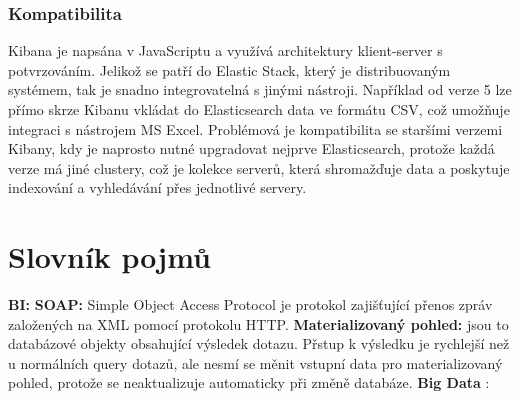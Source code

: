 \documentclass[czech,BP]{thesiskiv}
\begin{document}
 \subsection{Kompatibilita}
	Kibana je napsána v JavaScriptu a využívá architektury klient-server s potvrzováním. Jelikož se patří do Elastic Stack, který je distribuovaným systémem, tak je snadno integrovatelná s jinými nástroji. Například od verze 5 lze přímo skrze Kibanu vkládat do Elasticsearch data ve formátu CSV, což umožňuje integraci s nástrojem MS Excel. Problémová je kompatibilita se staršími verzemi Kibany, kdy je naprosto nutné upgradovat nejprve Elasticsearch, protože každá verze má jiné clustery, což je kolekce serverů, která shromažďuje data a poskytuje indexování a vyhledávání přes jednotlivé servery.
 
 
% 
%
\chapter{Slovník pojmů}
\textbf{BI:}  \cite{BI} \label{BI_slovnik}
\newline \textbf{SOAP:} Simple Object Access Protocol je protokol zajišťující přenos zpráv založených na XML pomocí protokolu HTTP.
\newline \textbf{Materializovaný pohled:} jsou to databázové objekty obsahující výsledek dotazu. Přstup k výsledku je rychlejší než u normálních query dotazů, ale nesmí se měnit vstupní data pro materializovaný pohled, protože se neaktualizuje automaticky při změně databáze.
\newline
\textbf{Big Data} :  \cite{BigData}

{\raggedright\small

}
\end{document}
